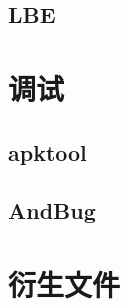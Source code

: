 \subsection{LBE}

\section{调试}
\label{Sec:debug}
\subsection{apktool}
\subsection{AndBug}

\section{衍生文件}
